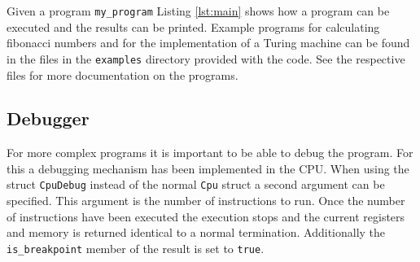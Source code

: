 Given a program \lstinline{my_program} Listing \ref{lst:main} shows how a program can be
executed and the results can be printed. Example programs for calculating fibonacci numbers
and for the implementation of a Turing machine can be found in the files in the \texttt{examples} directory provided 
with the code. See the respective files for more documentation on the programs. 



\subsection{Debugger}
For more complex programs it is important to be able to debug the program. For this
a debugging mechanism has been implemented in the CPU. When using the struct 
\lstinline{CpuDebug} instead of the normal \lstinline{Cpu} struct a second argument
can be specified. This argument is the number of instructions to run. Once the number
of instructions have been executed the execution stops and the current registers and
memory is returned identical to a normal termination. Additionally the \lstinline{is_breakpoint} member of the result is set to \lstinline{true}.

